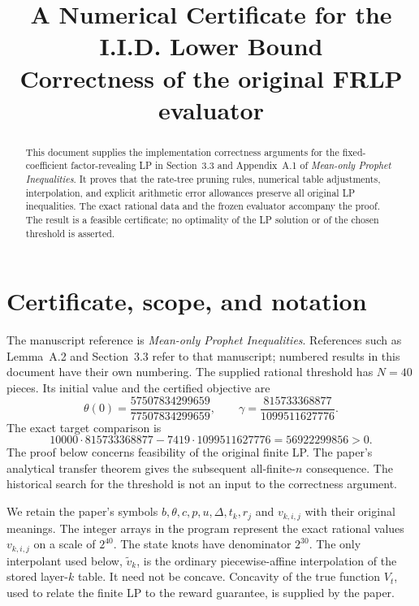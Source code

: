 \documentclass[11pt,a4paper]{article}
\title{A Numerical Certificate for the I.I.D. Lower Bound\\[3pt]
\large Correctness of the original FRLP evaluator}
\author{}
\date{}
\theoremstyle{remark}
\begin{document}
\maketitle
\begin{abstract}
This document supplies the implementation correctness arguments for the
fixed-coefficient factor-revealing LP in Section~3.3 and Appendix~A.1 of
\emph{Mean-only Prophet Inequalities}. It proves that the rate-tree
pruning rules, numerical table adjustments, interpolation, and explicit
arithmetic error allowances preserve all original LP inequalities.
The exact rational data and the frozen evaluator accompany the proof.
The result is a feasible certificate; no optimality of the LP solution
or of the chosen threshold is asserted.
\end{abstract}
\tableofcontents

\section{Certificate, scope, and notation}
The manuscript reference is \emph{Mean-only Prophet Inequalities}.
References such as Lemma~A.2 and Section~3.3 refer to that manuscript;
numbered results in this document have their own numbering.
The supplied rational threshold has $N=40$ pieces. Its initial value and
the certified objective are
\[
 \theta(0)=\frac{57507834299659}{77507834299659},\qquad
 \gamma=\frac{815733368877}{1099511627776}.
\]
The exact target comparison is
\[
10000\cdot815733368877-7419\cdot1099511627776
=56922299856>0.
\]
The proof below concerns feasibility of the original finite LP. The
paper's analytical transfer theorem gives the subsequent all-finite-$n$
consequence. The historical search for the threshold is not an input to
the correctness argument.

We retain the paper's symbols $b,\theta,c,p,u,\Delta,t_k,r_j$ and
$v_{k,i,j}$ with their original meanings. The integer arrays in the
program represent the exact rational values $v_{k,i,j}$ on a scale of
$2^{40}$. The state knots have denominator $2^{30}$.
The only interpolant used below, $\widetilde v_k$, is the ordinary
piecewise-affine interpolation of the stored layer-$k$ table.
It need not be concave. Concavity of the true function $V_t$, used to
relate the finite LP to the reward guarantee, is supplied by the paper.
\end{document}
